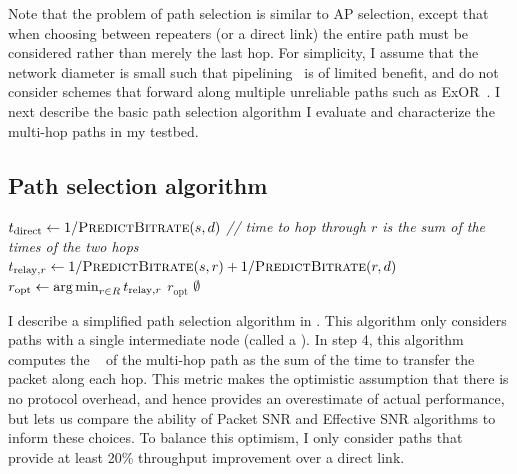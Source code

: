 Note that the problem of path selection is similar to AP selection, except that when choosing between repeaters (or a direct link) the entire path must be considered rather than merely the last hop. For simplicity, I assume that the network diameter is small such that pipelining~\cite{Rodrig_thesis} is of limited benefit, and do not consider schemes that forward along multiple unreliable paths such as ExOR~\cite{Biswas_ExOR}. I next describe the basic path selection algorithm I evaluate and characterize the multi-hop paths in my testbed.


\subsection{Path selection algorithm}
\begin{algorithm}[tp]
\caption{\label{alg:relay_sel_basic}}
\begin{algorithmic}[1]
\STATE $t_\text{direct} \gets 1/\textsc{PredictBitrate}(s,d)$ 
\STATE \emph{// time to hop through $r$ is the sum of the times of the two hops}
\STATE $t_{\text{relay},r} \gets 1/\textsc{PredictBitrate}(s,r) + 1/\textsc{PredictBitrate}(r,d)$
\ENDFOR
\STATE $r_\text{opt} \gets \operatorname*{arg\,min}_{r\in R} t_{\text{relay},r}$ 
\RETURN $r_\text{opt}$ 
\ELSE
\RETURN $\emptyset$ 
\ENDIF
\end{algorithmic}
\end{algorithm}

I describe a simplified path selection algorithm in . This  algorithm only considers paths with a single intermediate node (called a ). In step 4, this algorithm computes the ~\cite{Draves_ETT} of the multi-hop path as the sum of the time to transfer the packet along each hop. This metric makes the optimistic assumption that there is no protocol overhead, and hence provides an overestimate of actual performance, but lets us compare the ability of Packet SNR and Effective SNR algorithms to inform these choices. To balance this optimism, I only consider paths that provide at least 20\% throughput improvement over a direct link.

